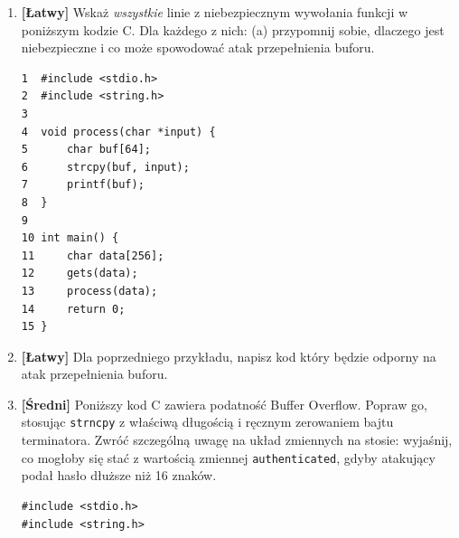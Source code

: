 \documentclass[12pt,a4paper]{article}
\begin{document}
\begin{enumerate}
 
    \item \textbf{[Łatwy]} Wskaż \emph{wszystkie} linie z niebezpiecznym wywołania funkcji w poniższym kodzie C. Dla każdego z nich:
    (a) przypomnij sobie, dlaczego jest niebezpieczne i co może spowodować atak przepełnienia buforu.
    \begin{tcolorbox}
    \begin{verbatim}
1  #include <stdio.h>
2  #include <string.h>
3   
4  void process(char *input) {
5      char buf[64];
6      strcpy(buf, input);
7      printf(buf); 
8  }
9   
10 int main() {
11     char data[256];
12     gets(data); 
13     process(data);
14     return 0;
15 }
    \end{verbatim}
    \end{tcolorbox}
    
    \item \textbf{[Łatwy]} Dla poprzedniego przykładu, napisz kod który będzie odporny na atak przepełnienia buforu.
 
 
    \item \textbf{[Średni]} Poniższy kod C zawiera podatność
    Buffer Overflow. Popraw go, stosując \texttt{strncpy}
    z właściwą długością i ręcznym zerowaniem bajtu terminatora.
    Zwróć szczególną uwagę na układ zmiennych na stosie: wyjaśnij,
    co mogłoby się stać z wartością zmiennej \texttt{authenticated},
    gdyby atakujący podał hasło dłuższe niż 16 znaków.
    \begin{tcolorbox}
    \begin{verbatim}
#include <stdio.h>
#include <string.h>
 

\end{verbatim}
\end{tcolorbox}
\end{enumerate}
\end{document}
